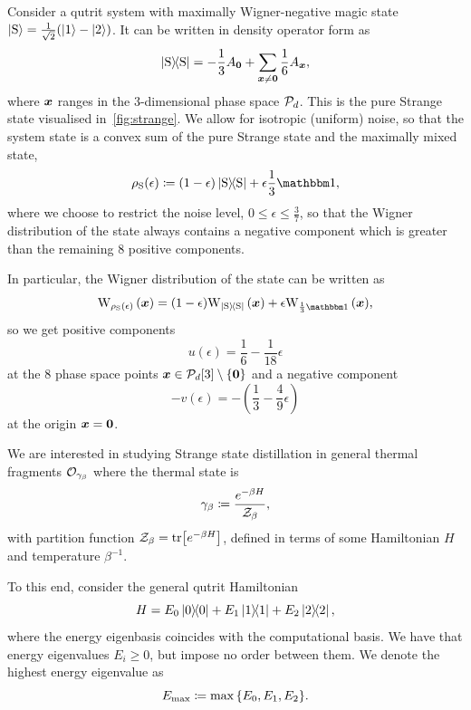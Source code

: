 \documentclass[pra,
aps,
twocolumn,
superscriptaddress,
groupedaddress,
nofootinbib,
reprint
]{revtex4-1}
\begin{document}
Consider a qutrit system with maximally Wigner-negative magic state $\ket{{\rm{S}}} = \frac{1}{\sqrt{2}}(\ket{1} - \ket{2})$.
It can be written in density operator form as
\begin{align}
	\ketbra{\rm{S}} = -\frac{1}{3} A_{\bmo} + \sum_{\bmx \neq \bmo} \frac{1}{6} A_{\bmx},
\end{align}
where $\bmx$ ranges in the $3$-dimensional phase space $\cal{P}_d$.
This is the pure Strange state visualised in~\cref{fig:strange}.
We allow for isotropic (uniform) noise, so that the system state is a convex sum of the pure Strange state and the maximally mixed state,
\begin{equation}
	\rho_{\rm{S}}(\epsilon) \coloneqq (1-\epsilon)\ketbra{\rm{S}} + \epsilon \frac{1}{3}\id,
\end{equation}
where we choose to restrict the noise level, $0 \leq \epsilon \leq \frac{3}{7}$, so that the Wigner distribution of the state always contains a negative component which is greater than the remaining 8 positive components.

In particular, the Wigner distribution of the state can be written as 
\begin{equation}
	\W[\bmx]{\rho_{\rm{S}}(\epsilon)} = (1-\epsilon)\W[\bmx]{\ketbra{\rm{S}}} + \epsilon\W[\bmx]{\frac{1}{3}\id},
\end{equation}
so we get positive components
\begin{equation}
	u(\epsilon) = \frac{1}{6} -\frac{1}{18}\epsilon
\end{equation}
at the 8 phase space points $\bmx \in \cal{P}_d[3] \setminus \{\bmo\}$ and a negative component
\begin{equation}
	- v(\epsilon) = - \left( \frac{1}{3} -\frac{4}{9}\epsilon \right)
\end{equation}
at the origin $\bmx = \bmo$.

We are interested in studying Strange state distillation in general thermal fragments $\O_{\gamma_\beta}$ where the thermal state is
\begin{equation}
	\gamma_\beta \coloneqq \frac{e^{-\beta H}}{\Z_\beta},
\end{equation}
with partition function $\Z_\beta = \tr \big[e^{-\beta H} \big]$, defined in terms of some Hamiltonian $H$ and temperature $\beta^{-1}$.

To this end, consider the general qutrit Hamiltonian
\begin{equation}
	H = E_0 \ketbra{0} + E_1 \ketbra{1} + E_2 \ketbra{2},
\end{equation}
where the energy eigenbasis coincides with the computational basis.
We have that energy eigenvalues $E_i \geq 0$, but impose no order between them.
We denote the highest energy eigenvalue as
\begin{equation}
	E_{\rm{max}} \coloneqq \max{\{E_0, E_1, E_2\}}.
\end{equation}
\end{document}
